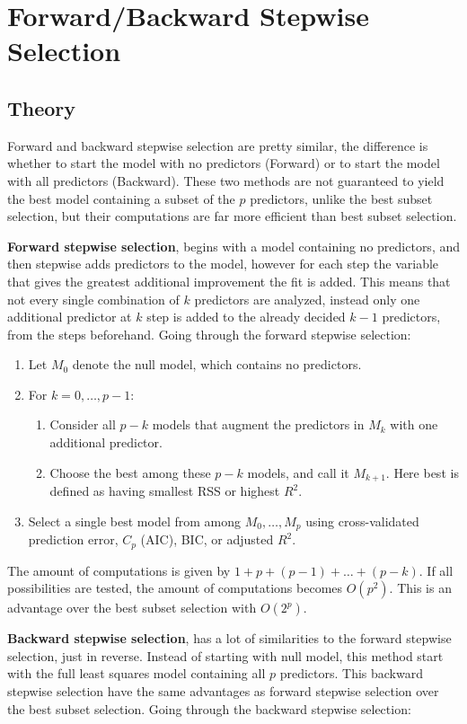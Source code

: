 \section{Forward/Backward Stepwise Selection}
\subsection{Theory}
Forward and backward stepwise selection are pretty similar, the difference is whether to start the model with no predictors (Forward) or to start the model with all predictors (Backward). These two methods are not guaranteed to yield the best model containing a subset of the $p$ predictors, unlike the best subset selection, but their computations are far more efficient than best subset selection.

\textbf{Forward stepwise selection}, begins with a model containing no predictors, and then stepwise adds predictors to the model, however for each step the variable that gives the greatest additional improvement the fit is added. This means that not every single combination of $k$ predictors are analyzed, instead only one additional predictor at $k$ step is added to the already decided $k-1$ predictors, from the steps beforehand. Going through the forward stepwise selection:
\begin{enumerate}
	\item Let $M_0$ denote the null model, which contains no predictors.
	\item For $k=0,\dots,p-1$:
	\begin{enumerate}
		\item Consider all $p-k$ models that augment the predictors in $M_k$ with one additional predictor.
		\item Choose the best among these $p-k$ models, and call it $M_{k+1}$. Here best is defined as having smallest RSS or highest $R^2$.
	\end{enumerate}
	\item Select a single best model from among $M_0,\dots,M_p$ using cross-validated prediction error, $C_p$ (AIC), BIC, or adjusted $R^2$. 
\end{enumerate}

The amount of computations is given by $1+p+(p-1)+\dots+(p-k)$. If all possibilities are tested, the amount of computations becomes $O(p^2)$. This is an advantage over the best subset selection with $O(2^p)$.

\textbf{Backward stepwise selection}, has a lot of similarities to the forward stepwise selection, just in reverse. Instead of starting with null model, this method start with the full least squares model containing all $p$ predictors. This backward stepwise selection have the same advantages as forward stepwise selection over the best subset selection. Going through the backward stepwise selection:

